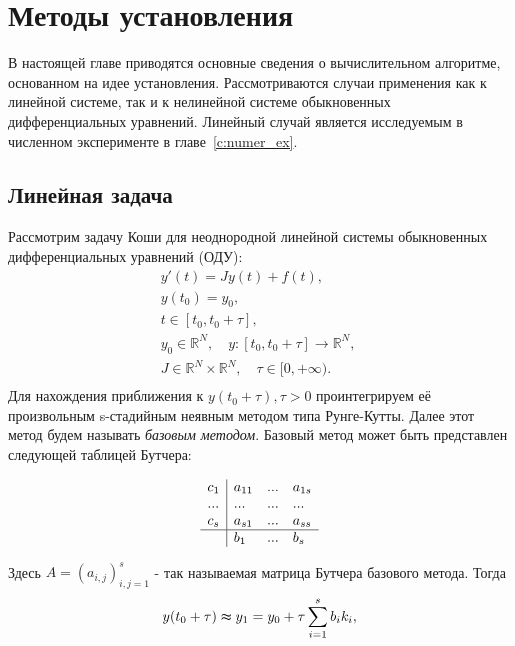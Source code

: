 \documentclass[a4paper,14pt]{extreport}
\begin{document}
  
  

  \chapter{Методы установления}
  \label{c:stead_methods}
  В настоящей главе приводятся основные сведения о вычислительном алгоритме, основанном на идее установления. Рассмотриваются случаи применения как к линейной системе, так и к нелинейной системе обыкновенных дифференциальных уравнений. Линейный случай является исследуемым в численном эксперименте в главе~\ref{c:numer_ex}.
  
  \section{Линейная задача}
  \label{s:linear_problem}
Рассмотрим задачу Коши для неоднородной линейной системы обыкновенных дифференциальных уравнений (ОДУ):
	\begin{equation}
	\begin{aligned}
	\label{main_problem}
	&y'(t)=Jy(t)+f(t),\\
	&y(t_0)=y_0,\\
	&t \in [t_0, t_0+\tau],\quad \\
	&y_0\in \mathbb{R}^N,\quad
	y:[t_0,t_0+\tau] \to \mathbb{R}^N,\quad\\
	&J \in \mathbb{R}^N \times \mathbb{R}^N, \quad
	\tau \in [0, +\infty).\\
	\end{aligned}
	\end{equation} 
Для нахождения приближения к $y(t_0 + \tau), \tau > 0$ проинтегрируем её произвольным s-стадийным неявным методом типа Рунге-Кутты. Далее этот метод будем называть \textit{базовым методом}. Базовый метод может быть представлен следующей таблицей Бутчера:
	\begin{center}
	\begin{equation}
	\label{base_method}
	\begin{array}{l|lll}
	c_1& a_{11}& ...& a_{1s}\\
	...& ...& ...& ...\\
	c_s& a_{s1}& ...& a_{ss}\\
	\hline
	& b_1& ...& b_s\\
	\end{array}
	\end{equation}
	\end{center}
Здесь $A=(a_{i,j})_{i,j=1}^s$ - так называемая матрица Бутчера
базового метода. Тогда
	$$ y(t_0+\tau)\thickapprox y_1=y_0+\tau\sum_{i=1}^sb_ik_i,$$
\end{document}
